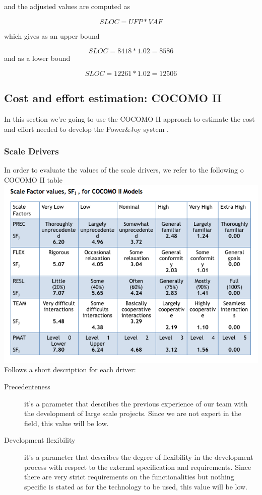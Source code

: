 \documentclass{article}
\begin{document}
\begin{flushleft}
and the adjusted values are computed as 

\[SLOC= UFP * VAF \]

which gives as an upper bound 

\[ SLOC= 8418 * 1.02 =    8586      \]
 and as a lower bound
 
 \[SLOC = 12261 * 1.02 = 12506      \]


\subsection{Cost and effort estimation: COCOMO II} %
In this section we're going to use the COCOMO II approach to estimate the cost and effort needed to develop the Power\&Joy system .



\subsubsection{Scale Drivers} %
In order to evaluate the values of the scale drivers, we refer to the following o COCOMO II table
\vspace{0.5cm}
\includegraphics[scale=0.5]{cocomo/scale}
\vspace{0.5cm}
\newpage
Follows a short description for each driver:
\begin{description}
\item[Precedenteness] it's a parameter that describes the previous experience of our team with the development of large scale projects. Since we are not expert in the field, this value will be low.
\item[Development flexibility] it's a parameter that describes the degree of flexibility in the development process with respect to the external specification and requirements. Since there are very strict requirements on the functionalities but nothing specific is stated as for the technology to be used, this value will be low.

\end{description}
\end{flushleft}
\end{document}
